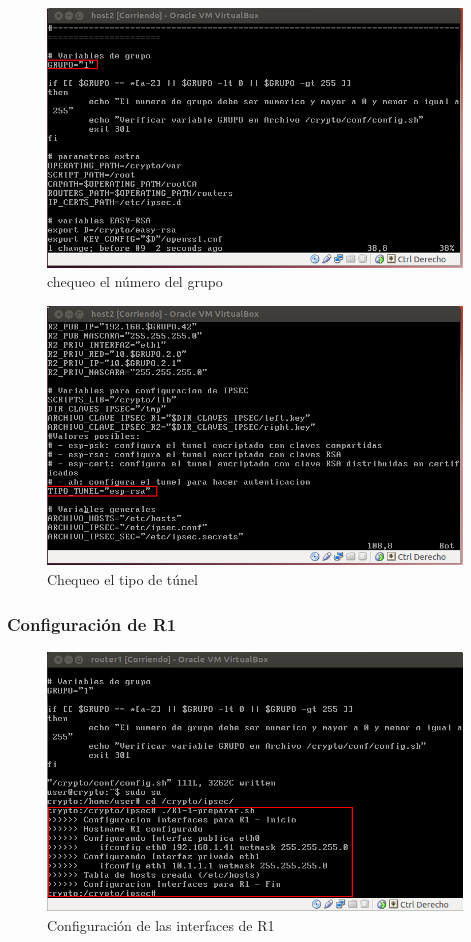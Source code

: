 \documentclass[a4paper,10pt]{article}
\begin{document}
	\begin{figure}[!htb]
		\centering
		\includegraphics[width=11cm]{Imagenes/chequeoNombreGrupo.png}
		\caption{chequeo el número del grupo} \label{img012}
	\end{figure}	
	\begin{figure}[!htb]
		\centering
		\includegraphics[width=11cm]{Imagenes/chequeoTipoTunel.png}
		\caption{Chequeo el tipo de túnel} \label{img013}
	\end{figure}	

			\subsubsection{Configuraci\'on de R1}
	\begin{figure}[H]
		\centering
		\includegraphics[width=11cm]{Imagenes/prepararR1.png}
		\caption{Configuraci\'on de las interfaces de R1} \label{img014}
	\end{figure}	
\end{document}
